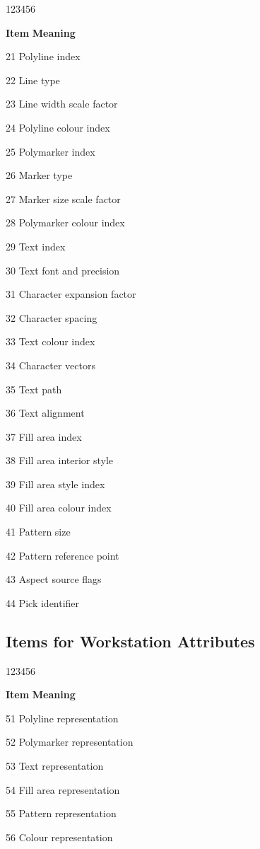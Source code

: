 \begin{DLtt}{123456}
\item[{\rm\bf Item}] {\bf Meaning}
\item[21]Polyline index
\item[22]Line type
\item[23]Line width scale factor
\item[24]Polyline colour index
\item[25]Polymarker index
\item[26]Marker type
\item[27]Marker size scale factor
\item[28]Polymarker colour index
\item[29]Text index
\item[30]Text font and precision
\item[31]Character expansion factor
\item[32]Character spacing
\item[33]Text colour index
\item[34]Character vectors
\item[35]Text path
\item[36]Text alignment
\item[37]Fill area index
\item[38]Fill area interior style
\item[39]Fill area style index
\item[40]Fill area colour index
\item[41]Pattern size
\item[42]Pattern reference point
\item[43]Aspect source flags
\item[44]Pick identifier
\end{DLtt}

\subsection*{Items for Workstation Attributes}

\begin{DLtt}{123456}
\item[{\rm\bf Item}] {\bf Meaning}
\item[51]Polyline representation
\item[52]Polymarker representation
\item[53]Text representation
\item[54]Fill area representation
\item[55]Pattern representation
\item[56]Colour representation
\end{DLtt}

